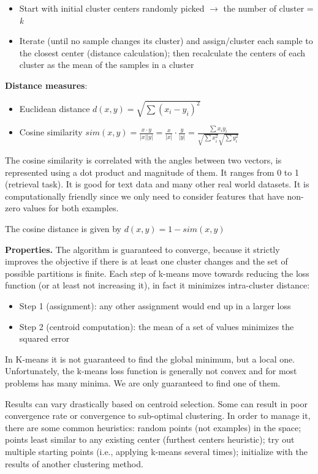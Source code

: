 \documentclass{article}
\begin{document}
\begin{itemize}
	\item Start with initial cluster centers randomly picked $\rightarrow$ the number of cluster = \emph{k}
	\item Iterate (until no sample changes its cluster) and assign/cluster each sample to the closest center (distance calculation); then recalculate the centers of each cluster as the mean of the samples in a cluster
\end{itemize}


\textbf{Distance measures}:
\begin{itemize}
	\item Euclidean distance \(d(x, y) = \sqrt{\sum (x_i - y_i)^2}\)
	\item Cosine similarity \(sim(x, y) = \frac{x \cdot y}{|x||y|} = \frac{x}{|x|} \cdot \frac{y}{|y|} = \frac{\sum x_i y_i}{\sqrt{\sum x_i^2} \sqrt{\sum y_i^2}}\)
\end{itemize}

The cosine similarity is correlated with the angles between two vectors, is represented using a dot product and magnitude of them. It ranges from 0 to 1 (retrieval task). It is good for text data and many other real world datasets. It is computationally friendly since we only need to consider features that have non-zero values for both examples.

The cosine distance is given by \(d(x, y) = 1 - sim(x, y)\)
\bigskip


\textbf{Properties. } The algorithm is guaranteed to converge, because it strictly improves the objective if there is at least one cluster changes and the set of possible partitions is finite. Each step of k-means move towards reducing the loss function (or at least not increasing it), in fact it minimizes intra-cluster distance:

\begin{itemize}
\item Step 1 (assignment): any other assignment would end up in a larger loss
\item Step 2 (centroid computation): the mean of a set of values minimizes the squared error
\end{itemize}

In K-means it is not guaranteed to find the global minimum, but a local one. Unfortunately, the k-means loss function is generally not convex and for most problems has many minima. We are only guaranteed to find one of them.

Results can vary drastically based on centroid selection. Some can result in poor convergence rate or convergence to sub-optimal clustering. In order to manage it, there are some common heuristics: random points (not examples) in the space; points least similar to any existing center (furthest centers heuristic); try out multiple starting points (i.e., applying k-means several times); initialize with the results of another clustering method.
	
\end{document}
